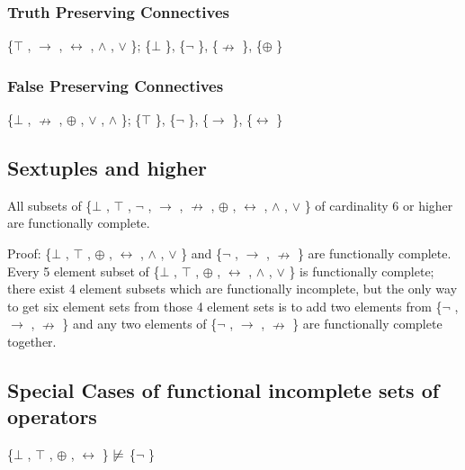\hypertarget{truth-preserving-connectives-2}{%
\subsubsection{Truth Preserving
Connectives}\label{truth-preserving-connectives-2}}

\{$\top$ , $\to$ , $\leftrightarrow$ , $\land$ , $\lor$ \}; \{$\bot$ \}, \{$\neg$ \}, \{$\nrightarrow$ \}, \{$\oplus$ \}

\hypertarget{false-preserving-connectives-2}{%
\subsubsection{False Preserving
Connectives}\label{false-preserving-connectives-2}}

\{$\bot$ , $\nrightarrow$ , $\oplus$ , $\lor$ , $\land$ \}; \{$\top$ \}, \{$\neg$ \}, \{$\to$ \}, \{$\leftrightarrow$ \}

\hypertarget{sextuples-and-higher}{%
\subsection{Sextuples and higher}\label{sextuples-and-higher}}

All subsets of \{$\bot$ , $\top$ , $\neg$ , $\to$ , $\nrightarrow$ , $\oplus$ , $\leftrightarrow$ , $\land$ , $\lor$ \} of cardinality 6 or higher
are functionally complete.

Proof: \{$\bot$ , $\top$ , $\oplus$ , $\leftrightarrow$ , $\land$ , $\lor$ \} and \{$\neg$ , $\to$ , $\nrightarrow$ \} are functionally complete.
Every 5 element subset of \{$\bot$ , $\top$ , $\oplus$ , $\leftrightarrow$ , $\land$ , $\lor$ \} is functionally complete;
there exist 4 element subsets which are functionally incomplete, but the
only way to get six element sets from those 4 element sets is to add two
elements from \{$\neg$ , $\to$ , $\nrightarrow$ \} and any two elements of \{$\neg$ , $\to$ , $\nrightarrow$ \} are
functionally complete together.

\hypertarget{special-cases-of-functional-incomplete-sets-of-operators}{%
\subsection{Special Cases of functional incomplete sets of
operators}\label{special-cases-of-functional-incomplete-sets-of-operators}}

\{$\bot$ , $\top$ , $\oplus$ , $\leftrightarrow$ \} $\nmodels$  \{$\neg$ \}

